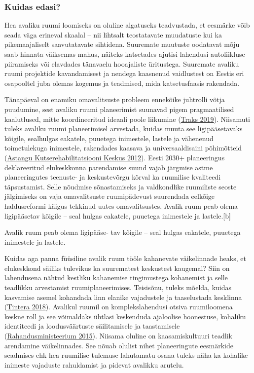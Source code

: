 \documentclass[estonian,]{article}
\begin{document}
\hypertarget{kuidas-edasi-1}{%
\subsubsection*{Kuidas edasi?}\label{kuidas-edasi-1}}

Hea avaliku ruumi loomiseks on oluline algatuseks teadvustada, et eesmärke võib seada väga erineval skaalal -- nii lihtsalt teostatavate muudatuste kui ka pikemaajaliselt saavutatavate sihtidena. Suuremate muutuste oodatavat mõju saab hinnata väiksemas mahus, näiteks katsetades ajutisi lahendusi autoliikluse piiramiseks või elavdades tänavaelu hooajaliste üritustega. Suuremate avaliku ruumi projektide kavandamisest ja nendega kaasnenud vaidlustest on Eestis eri osapooltel juba olemas kogemus ja teadmised, mida katsetusfaasis rakendada.

Tänapäeval on enamiku omavalitsuste probleem ennekõike juhtrolli võtja puudumine, sest avaliku ruumi planeerimist suunavad pigem pragmaatilised kaalutlused, mitte koordineeritud ideaali poole liikumine (\protect\hyperlink{Traks2019}{Traks 2019}). Niisamuti tuleks avaliku ruumi planeerimisel arvestada, kuidas muuta see ligipääsetavaks kõigile, sealhulgas eakatele, puuetega inimestele, lastele ja vähenenud toimetulekuga inimestele, rakendades kaasava ja universaaldisaini põhimõtteid (\protect\hyperlink{Astangu2012}{Astangu Kutserehabilitatsiooni Keskus 2012}). Eesti 2030+ planeeringus deklareeritud elukeskkonna parendamise suund vajab järgmise astme planeeringutes teenuste- ja keskustevõrgu kõrval ka ruumilise kvaliteedi täpsustamist. Selle nõudmise sõnastamiseks ja valdkondlike ruumiliste seoste jälgimiseks on vaja omavalitsuste ruumipädevust suurendada eelkõige haldusreformi käigus tekkinud uutes omavalitsustes.
Avalik ruum peab olema ligipääsetav kõigile -- seal hulgas eakatele, puuetega inimestele ja lastele.{[}b{]}

\begin{blockquote-right}
Avalik ruum peab olema ligipääse- tav kõigile -- seal hulgas eakatele,
puuetega inimestele ja lastele.
\end{blockquote-right}

Kuidas aga panna füüsiline avalik ruum tööle kahanevate väikelinnade heaks, et elukeskkond säiliks tulevikus ka suurematest keskustest kaugemal? Siin on lahendusena nähtud kestliku kahanemise tingimustega kohanemist ja selle teadlikku arvestamist ruumiplaneerimises. Teisisõnu, tuleks mõelda, kuidas kasvamise asemel kohandada linn elanike vajadustele ja taaselustada kesklinna (\protect\hyperlink{Tintera2018}{Tintera 2018}). Avalikul ruumil on komplekslahendusi otsiva ruumiloomena keskne roll ja see võimaldaks ühtlasi keskenduda ajaloolise hoonestuse, kohaliku identiteedi ja loodusväärtuste säilitamisele ja taastamisele (\protect\hyperlink{Rahandusministeerium2015}{Rahandusministeerium 2015}). Niisama oluline on kaasamiskultuuri teadlik arendamine väikelinnades. See nõuab olulist nihet planeeringute eesmärkide seadmises ehk hea ruumilise tulemuse lahutamatu osana tuleks näha ka kohalike inimeste vajaduste rahuldamist ja pidevat avalikku arutelu.
\end{document}
